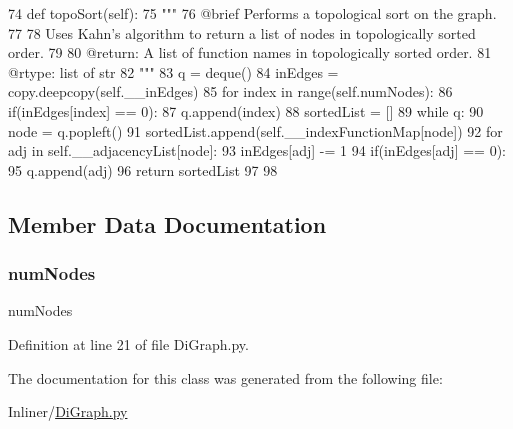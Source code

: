 \begin{DoxyCode}
74     \textcolor{keyword}{def }topoSort(self):
75         \textcolor{stringliteral}{"""
}
76 \textcolor{stringliteral}{        @brief Performs a topological sort on the graph.
}
77 \textcolor{stringliteral}{
}
78 \textcolor{stringliteral}{        Uses Kahn's algorithm to return a list of nodes in topologically sorted order.
}
79 \textcolor{stringliteral}{
}
80 \textcolor{stringliteral}{        @return: A list of function names in topologically sorted order.
}
81 \textcolor{stringliteral}{        @rtype: list of str
}
82 \textcolor{stringliteral}{        """}
83         q = deque()
84         inEdges = copy.deepcopy(self.\_\_inEdges)
85         \textcolor{keywordflow}{for} index \textcolor{keywordflow}{in} range(self.numNodes):
86             if(inEdges[index] == 0):
87                 q.append(index)
88         sortedList = []
89         \textcolor{keywordflow}{while} q:
90             node = q.popleft()
91             sortedList.append(self.\_\_indexFunctionMap[node])
92             \textcolor{keywordflow}{for} adj \textcolor{keywordflow}{in} self.\_\_adjacencyList[node]:
93                 inEdges[adj] -= 1
94                 if(inEdges[adj] == 0):
95                     q.append(adj)
96         \textcolor{keywordflow}{return} sortedList
97 
98 \end{DoxyCode}


\subsection{Member Data Documentation}
\mbox{\label{classDiGraph_1_1DiGraph_af9bd6d4d8ecd1b0563241fd648435e14}} 
\subsubsection{\texorpdfstring{num\+Nodes}{numNodes}}
{\footnotesize\ttfamily num\+Nodes}



Definition at line 21 of file Di\+Graph.\+py.



The documentation for this class was generated from the following file\+:\begin{DoxyCompactItemize}
\item 
Inliner/\hyperlink{DiGraph_8py}{Di\+Graph.\+py}\end{DoxyCompactItemize}
